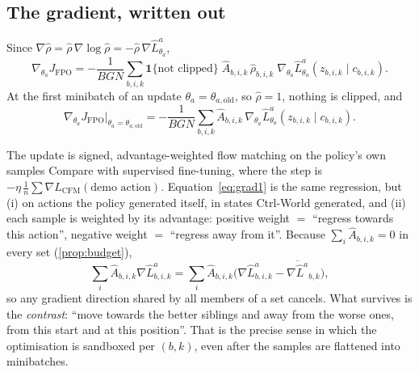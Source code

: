 \documentclass[11pt,a4paper]{article}
\newcommand{\tha}{\theta_a}
\newcommand{\thao}{\theta_{a,\mathrm{old}}}
\newcommand{\Lh}{\hat L^{a}}
\newcommand{\Ah}{\hat A}
\theoremstyle{remark}
\begin{document}
\subsection{The gradient, written out}
Since $\nabla\hat\rho=\hat\rho\,\nabla\log\hat\rho=-\hat\rho\,\nabla\Lh_{\tha}$,
\begin{equation}
\nabla_{\tha}J_{\mathrm{FPO}}=-\frac1{BGN}\sum_{b,i,k}\mathbf 1\{\text{not clipped}\}\;\Ah_{b,i,k}\,\hat\rho_{b,i,k}\;\nabla_{\tha}\Lh_{\tha}(z_{b,i,k}\mid c_{b,i,k}).
\label{eq:grad}
\end{equation}
At the first minibatch of an update $\tha=\thao$, so $\hat\rho=1$, nothing is clipped, and
\begin{equation}
\nabla_{\tha}J_{\mathrm{FPO}}\big|_{\tha=\thao}=-\frac1{BGN}\sum_{b,i,k}\Ah_{b,i,k}\,\nabla_{\tha}\Lh_{\tha}(z_{b,i,k}\mid c_{b,i,k}).
\label{eq:grad1}
\end{equation}
\begin{intuition}{The update is signed, advantage-weighted flow matching on the policy's own samples}
Compare with supervised fine-tuning, where the step is $-\eta\,\frac1n\sum\nabla L_{\mathrm{CFM}}(\text{demo action})$. Equation~\eqref{eq:grad1} is the same regression, but (i) on actions the policy generated itself, in states Ctrl-World generated, and (ii) each sample is weighted by its advantage: positive weight $=$ ``regress towards this action'', negative weight $=$ ``regress away from it''. Because $\sum_i\Ah_{b,i,k}=0$ in every set (\cref{prop:budget}),
\[
\sum_{i}\Ah_{b,i,k}\nabla\Lh_{b,i,k}=\sum_i\Ah_{b,i,k}\big(\nabla\Lh_{b,i,k}-\overline{\nabla\Lh}_{b,k}\big),
\]
so any gradient direction shared by all members of a set cancels. What survives is the \emph{contrast}: ``move towards the better siblings and away from the worse ones, from this start and at this position''. That is the precise sense in which the optimisation is sandboxed per $(b,k)$, even after the samples are flattened into minibatches.
\end{intuition}
\end{document}
